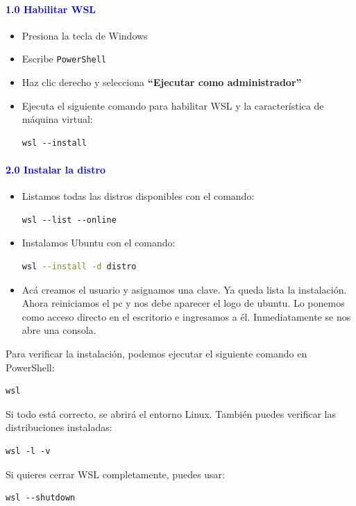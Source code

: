\documentclass[12pt]{article}
\begin{document}
\paragraph{\textcolor{blue}{1.0 Habilitar WSL}}
\begin{itemize}
    \item Presiona la tecla de Windows
    \item Escribe \texttt{PowerShell}
    \item Haz clic derecho y selecciona \textbf{``Ejecutar como administrador''}
    \item Ejecuta el siguiente comando para habilitar WSL y la característica de máquina virtual:
\begin{lstlisting}
wsl --install
\end{lstlisting}
\end{itemize}

\paragraph{\textcolor{blue}{2.0 Instalar la distro}}
\begin{itemize}
    \item Listamos todas las distros disponibles con el comando:
\begin{lstlisting}
wsl --list --online
\end{lstlisting}
    \item Instalamos Ubuntu con el comando:
\begin{lstlisting}[language=bash]
wsl --install -d distro 
\end{lstlisting}
    \item Acá creamos el usuario y asignamos una clave. Ya queda lista la instalación. 
    Ahora reiniciamos el pc y nos debe aparecer el logo de ubuntu. 
    Lo ponemos como acceso directo en el escritorio e ingresamos a él. 
    Inmediatamente se nos abre una consola.
\end{itemize}

Para verificar la instalación, podemos ejecutar el siguiente comando en PowerShell:
\begin{lstlisting}
wsl
\end{lstlisting}
Si todo está correcto, se abrirá el entorno Linux. También puedes verificar las distribuciones instaladas:
\begin{lstlisting}
wsl -l -v
\end{lstlisting}
Si quieres cerrar WSL completamente, puedes usar:
\begin{lstlisting}
wsl --shutdown
\end{lstlisting}
\end{document}
